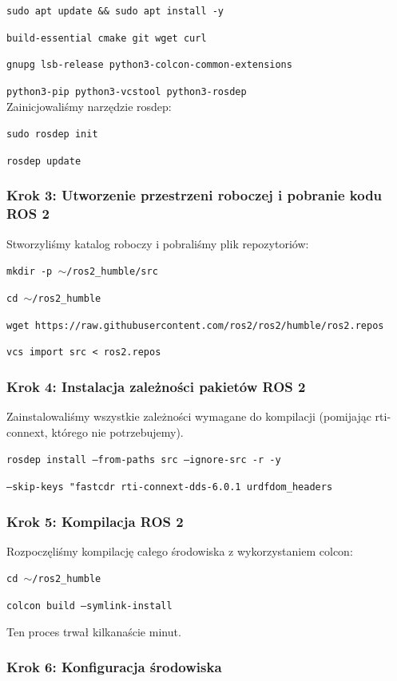 \documentclass[12pt]{article}
\begin{document}
\texttt{sudo apt update \&\& sudo apt install -y}


\texttt{build-essential cmake git wget curl}


\texttt{gnupg lsb-release python3-colcon-common-extensions}


\texttt{python3-pip python3-vcstool python3-rosdep}
\\

Zainicjowaliśmy narzędzie rosdep:

\texttt{sudo rosdep init}


\texttt{rosdep update}


\subsubsection{Krok 3: Utworzenie przestrzeni roboczej i pobranie kodu ROS 2}

Stworzyliśmy katalog roboczy i pobraliśmy plik repozytoriów:


\texttt{mkdir -p $\sim$/ros2\_humble/src}

\texttt{cd $\sim$/ros2\_humble}

\texttt{wget https://raw.githubusercontent.com/ros2/ros2/humble/ros2.repos}

\texttt{vcs import src < ros2.repos}

\subsubsection{Krok 4: Instalacja zależności pakietów ROS 2}

Zainstalowaliśmy wszystkie zależności wymagane do kompilacji (pomijając rti-connext, którego nie potrzebujemy).


\texttt{rosdep install --from-paths src --ignore-src -r -y}

\texttt{--skip-keys "fastcdr rti-connext-dds-6.0.1 urdfdom\_headers}


\subsubsection{Krok 5: Kompilacja ROS 2}

Rozpoczęliśmy kompilację całego środowiska z wykorzystaniem colcon:

\texttt{cd $\sim$/ros2\_humble}

\texttt{colcon build --symlink-install}

Ten proces trwał kilkanaście minut.


\subsubsection{Krok 6: Konfiguracja środowiska}
\end{document}
